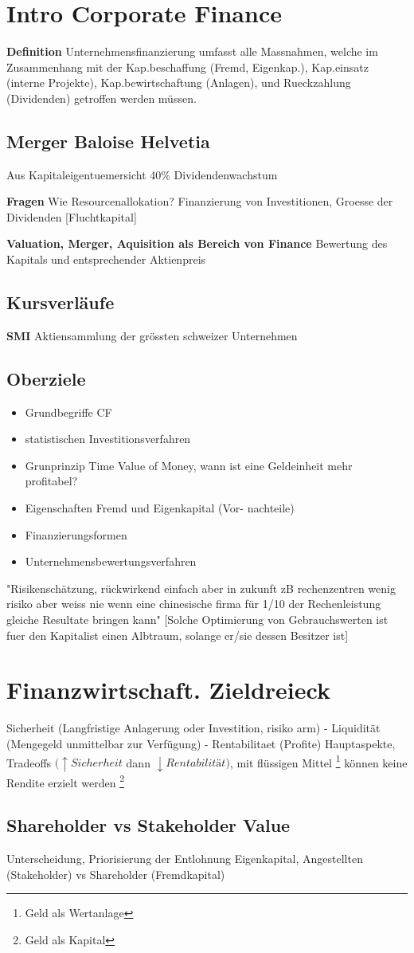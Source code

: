 \section{Intro Corporate Finance}
\textbf{Definition} Unternehmensfinanzierung umfasst alle Massnahmen, welche im Zusammenhang mit der Kap.beschaffung (Fremd, Eigenkap.), Kap.einsatz (interne Projekte), Kap.bewirtschaftung (Anlagen), und Rueckzahlung (Dividenden) getroffen werden müssen.
\subsection{Merger Baloise Helvetia}
Aus Kapitaleigentuemersicht 40\% Dividendenwachstum

\textbf{Fragen} Wie Resourcenallokation? Finanzierung von Investitionen, Groesse der Dividenden [Fluchtkapital]    


\textbf{Valuation, Merger, Aquisition als Bereich von Finance}
Bewertung des Kapitals und entsprechender Aktienpreis 

\subsection{Kursverläufe}
\textbf{SMI} Aktiensammlung der grössten schweizer Unternehmen

\subsection{Oberziele}
\begin{itemize}
    \item Grundbegriffe CF
    \item statistischen Investitionsverfahren
    \item Grunprinzip Time Value of Money, wann ist eine Geldeinheit mehr profitabel?
    \item Eigenschaften Fremd und Eigenkapital (Vor- nachteile)
    \item Finanzierungsformen 
    \item Unternehmensbewertungsverfahren
\end{itemize}

"Risikenschätzung, rückwirkend einfach aber in zukunft zB rechenzentren wenig risiko aber weiss nie wenn eine chinesische firma für 1/10 der Rechenleistung gleiche Resultate bringen kann"
[Solche Optimierung von Gebrauchswerten ist fuer den Kapitalist einen Albtraum, solange er/sie dessen Besitzer ist]


\section{Finanzwirtschaft. Zieldreieck}
Sicherheit (Langfristige Anlagerung oder Investition, risiko arm) - Liquidität (Mengegeld unmittelbar zur Verfügung) - Rentabilitaet (Profite)
Hauptaspekte, Tradeoffs $(\uparrow Sicherheit$ dann $\downarrow Rentabilität)$, mit flüssigen Mittel \footnote{Geld als Wertanlage} können keine Rendite erzielt werden \footnote{Geld als Kapital}

\subsection{Shareholder vs Stakeholder Value}
Unterscheidung, Priorisierung der Entlohnung Eigenkapital, Angestellten (Stakeholder) vs Shareholder (Fremdkapital)